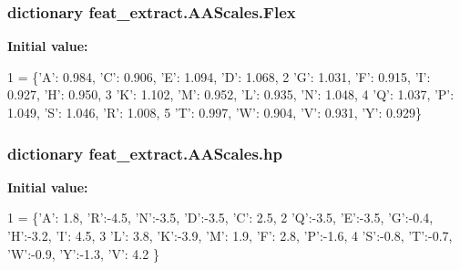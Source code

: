 \subsubsection[{Flex}]{\setlength{\rightskip}{0pt plus 5cm}dictionary feat\+\_\+extract.\+A\+A\+Scales.\+Flex}\label{namespacefeat__extract_1_1_a_a_scales_a824936f115db647e73ceeff2c8d795a5}
{\bfseries Initial value\+:}
\begin{DoxyCode}
1 = \{\textcolor{stringliteral}{'A'}: 0.984, \textcolor{stringliteral}{'C'}: 0.906, \textcolor{stringliteral}{'E'}: 1.094, \textcolor{stringliteral}{'D'}: 1.068,
2        \textcolor{stringliteral}{'G'}: 1.031, \textcolor{stringliteral}{'F'}: 0.915, \textcolor{stringliteral}{'I'}: 0.927, \textcolor{stringliteral}{'H'}: 0.950,
3        \textcolor{stringliteral}{'K'}: 1.102, \textcolor{stringliteral}{'M'}: 0.952, \textcolor{stringliteral}{'L'}: 0.935, \textcolor{stringliteral}{'N'}: 1.048,
4        \textcolor{stringliteral}{'Q'}: 1.037, \textcolor{stringliteral}{'P'}: 1.049, \textcolor{stringliteral}{'S'}: 1.046, \textcolor{stringliteral}{'}\textcolor{stringliteral}{R': 1.008,}
5 \textcolor{stringliteral}{       }\textcolor{stringliteral}{'T'}: 0.997, \textcolor{stringliteral}{'W'}: 0.904, \textcolor{stringliteral}{'V'}: 0.931, \textcolor{stringliteral}{'Y'}: 0.929\}
\end{DoxyCode}
\hypertarget{namespacefeat__extract_1_1_a_a_scales_a759a0e0d03a709fa1f94ef0efb172afd}{}
\subsubsection[{hp}]{\setlength{\rightskip}{0pt plus 5cm}dictionary feat\+\_\+extract.\+A\+A\+Scales.\+hp}\label{namespacefeat__extract_1_1_a_a_scales_a759a0e0d03a709fa1f94ef0efb172afd}
{\bfseries Initial value\+:}
\begin{DoxyCode}
1 = \{\textcolor{stringliteral}{'A'}: 1.8, \textcolor{stringliteral}{'}\textcolor{stringliteral}{R':-4.5, '}N':-3.5, 'D':-3.5, 'C': 2.5,
2       \textcolor{stringliteral}{'Q'}:-3.5, \textcolor{stringliteral}{'E'}:-3.5, \textcolor{stringliteral}{'G'}:-0.4, \textcolor{stringliteral}{'H'}:-3.2, \textcolor{stringliteral}{'I'}: 4.5,
3       \textcolor{stringliteral}{'L'}: 3.8, \textcolor{stringliteral}{'K'}:-3.9, \textcolor{stringliteral}{'M'}: 1.9, \textcolor{stringliteral}{'F'}: 2.8, \textcolor{stringliteral}{'P'}:-1.6,
4       \textcolor{stringliteral}{'S'}:-0.8, \textcolor{stringliteral}{'T'}:-0.7, \textcolor{stringliteral}{'W'}:-0.9, \textcolor{stringliteral}{'Y'}:-1.3, \textcolor{stringliteral}{'V'}: 4.2 \}
\end{DoxyCode}
\hypertarget{namespacefeat__extract_1_1_a_a_scales_a31f47ba59c154bdf8b32811b04d6fd36}{}
